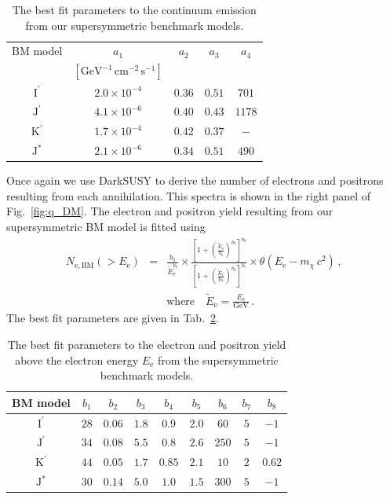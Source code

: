 \documentclass[10pt,aps,pra,reprint,amsmath,amsfonts,amssymb,showpacs,nofootinbib,floatfix]{revtex4-1}
\newcommand{\rmn}{\mathrm}
\newcommand{\ee}{E_\rmn{e}}
\newcommand{\Kp}{\rmn{K}^\prime}
\newcommand{\Ip}{\rmn{I}^\prime}
\newcommand{\Js}{\rmn{J}^*}
\newcommand{\Jp}{\rmn{J}^\prime}
\newcommand{\cm}{\rmn{cm}}
\newcommand{\eet}{\tilde{E}_\rmn{e}}
\newcommand{\gev}{\rmn{GeV}}
\newcommand{\e}{\rmn{e}}
\begin{document}
\begin{table}[h]
\begin{tabular}{c c c c c }
\hline
\hline
 BM model & $a_1$ & $a_2$  & $a_3$ & $a_4$ \\
          & $[\gev^{-1}\,\cm^{-2}\,\rmn{s}^{-1}]$ & & & \\
 \hline
$\Ip$ & $2.0\times10^{-4}$ & $0.36$ & $0.51$ & $701$  \\
$\Jp$ & $4.1\times10^{-6}$ & $0.40$ & $0.43$ & $1178$ \\
$\Kp$ & $1.7\times10^{-4}$ & $0.42$ & $0.37$ & $-$    \\
$\Js$ & $2.1\times10^{-6}$ & $0.34$ & $0.51$ & $490$  \\
\hline
\hline
\end{tabular}
\caption{The best fit parameters to the continuum emission from our
  supersymmetric benchmark models.
 \label{tab:bm_cont}}
\end{table} 

Once again we use {\sc DarkSUSY} to derive the number of electrons and
positrons resulting from each annihilation. This spectra is shown in
the right panel of Fig.~\ref{fig:q_DM}. The electron and positron
yield resulting from our supersymmetric BM model is fitted using
\begin{eqnarray}
N_{\e,\rmn{BM}}(>\ee) &=& \frac{b_1}{\eet^{b_2}}\times
\frac{\left[1+\left(\frac{\eet}{b_6}\right)^{b_7}\right]^{b_8}}
{\left[1+\left(\frac{\eet}{b_3}\right)^{b_4}\right]^{b_5}}
\times\theta(\ee-m_\chi\,c^2)\,,\nonumber\\
& &\rmn{where}\quad\eet=\frac{\ee}{\gev}\,.
\label{eq:bm_elec}
\end{eqnarray}
The best fit parameters are given in Tab.~\ref{tab:bm_elec}.
\begin{table}[h]
\begin{tabular}{c c c c c c c c c}
\hline
\hline
 BM model & $b_1$ & $b_2$ & $b_3$ & $b_4$ & $b_5$ & $b_6$ & $b_7$ & $b_8$ \\
 \hline
$\Ip$ & $28$ & $0.06$ & $1.8$ & $0.9$  & $2.0$ & $60$  & $5$ & $-1$     \\
$\Jp$ & $34$ & $0.08$ & $5.5$ & $0.8$  & $2.6$ & $250$ & $5$ & $-1$     \\
$\Kp$ & $44$ & $0.05$ & $1.7$ & $0.85$ & $2.1$ & $10$  & $2$ & $0.62$   \\
$\Js$ & $30$ & $0.14$ & $5.0$ & $1.0$  & $1.5$ & $300$ & $5$ & $-1$     \\
\hline
\hline
\end{tabular}
\caption{The best fit parameters to the electron and positron yield
  above the electron energy $\ee$ from the supersymmetric benchmark
  models.
 \label{tab:bm_elec}}
\end{table} 
\end{document}
